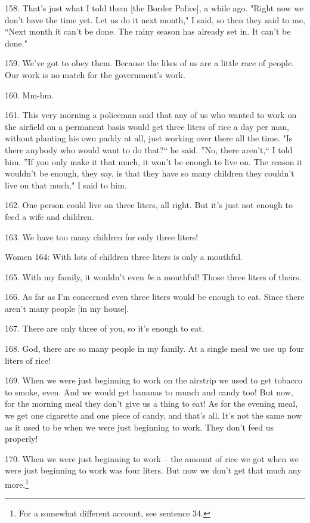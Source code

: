158. That's just what I told them [the Border Police], a while ago. "Right
now we don't have the time yet. Let us do it next month," I said, so then
they said to me, ``Next month it can't be done. The rainy season has already set
in. It can't be done."

159. We've got to obey them. Because the likes of us are a little race of people.
Our work is no match for the government's work.

160. Mm-hm.

161. This very morning a policeman said that any of us who wanted to work on the
airfield on a permanent basis would get three liters of rice a day per man, without
planting his own paddy at all, just working over there all the time. "Is
there anybody who would want to do that?`` he said. ''No, there
aren't,`` I told him. ''If you only make it that much, it won't
be enough to live on. The reason it wouldn't be enough, they say, is that they
have so many children they couldn't live on that much," I said to him.

162. One person could live on three liters, all right. But it's just not enough
to feed a wife and children.

163. We have too many children for only three liters!

Women 164: With lots of children three liters is only a mouthful.

165. With my family, it wouldn't even \textit{be} a mouthful! Those three liters
of theirs.

166. As far as I'm concerned even three liters would be enough to eat. Since there
aren't many people [in my house].

167. There are only three of you, so it's enough to eat.

168. God, there are so many people in my family. At a single meal we use up four
liters of rice!

169. When we were just beginning to work on the airstrip we used to get tobacco
to smoke, even. And we would get bananas to munch and candy too! But now, for the
morning meal they don't give us a thing to eat! As for the evening meal, we get
one cigarette and one piece of candy, and that's all. It's not the same now as
it used to be when we were just beginning to work. They don't feed us properly!

170. When we were just beginning to work -- the amount of rice we got when we were
just beginning to work was four liters. But now we don't get that much any more.\footnote{For a somewhat different account, see sentence 34.}

